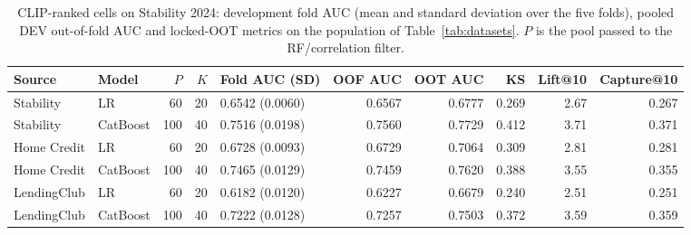 \documentclass[final,5p,twocolumn]{elsarticle}
\newcommand{\Kfeat}{K}
\begin{document}
\begin{table}[htbp]
\centering
\footnotesize
\begin{threeparttable}
\caption{CLIP-ranked cells on Stability 2024: development fold AUC (mean and standard deviation over the five folds), pooled DEV out-of-fold AUC and locked-OOT metrics on the population of Table~\ref{tab:datasets}. $P$ is the pool passed to the RF/correlation filter.}
\label{tab:clip_cells}
\begin{tabular}{@{}llrrlrrrrr@{}}
\toprule
Source & Model & $P$ & $\Kfeat$ & Fold AUC (SD) & OOF AUC & OOT AUC & KS & Lift@10 & Capture@10 \\
\midrule
Stability & LR & 60 & 20 & 0.6542 (0.0060) & 0.6567 & 0.6777 & 0.269 & 2.67 & 0.267 \\
Stability & CatBoost & 100 & 40 & 0.7516 (0.0198) & 0.7560 & 0.7729 & 0.412 & 3.71 & 0.371 \\
Home Credit & LR & 60 & 20 & 0.6728 (0.0093) & 0.6729 & 0.7064 & 0.309 & 2.81 & 0.281 \\
Home Credit & CatBoost & 100 & 40 & 0.7465 (0.0129) & 0.7459 & 0.7620 & 0.388 & 3.55 & 0.355 \\
LendingClub & LR & 60 & 20 & 0.6182 (0.0120) & 0.6227 & 0.6679 & 0.240 & 2.51 & 0.251 \\
LendingClub & CatBoost & 100 & 40 & 0.7222 (0.0128) & 0.7257 & 0.7503 & 0.372 & 3.59 & 0.359 \\
\bottomrule
\end{tabular}
\end{threeparttable}
\end{table}
\end{document}
